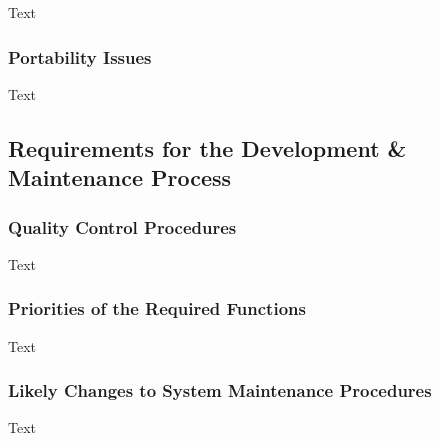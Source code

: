 \documentclass[12pt]{article}
\begin{document}
Text

\subsubsection {Portability Issues}

Text

\subsection{Requirements for the Development \& Maintenance Process}

\subsubsection {Quality Control Procedures}

Text

\subsubsection {Priorities of the Required Functions}

Text

\subsubsection {Likely Changes to System Maintenance Procedures}

Text
\end{document}
